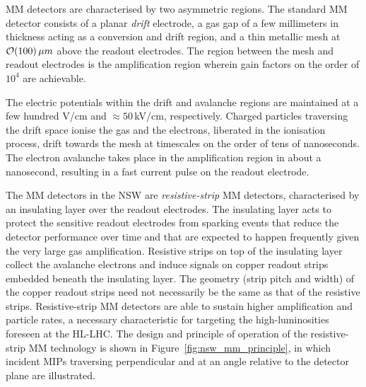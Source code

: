 MM detectors are characterised by two asymmetric regions.
The standard MM detector consists of a planar \textit{drift} electrode, a gas gap of
a few millimeters in thickness acting as a conversion and drift region, and a thin
metallic mesh at $\mathcal{O}(100)\,\mu m$ above the readout electrodes.
The region between the mesh and readout electrodes is the amplification region wherein
gain factors on the order of $10^4$ are achievable.

The electric potentials within the drift and avalanche regions are maintained
at a few hundred V/cm and $\approx50$\,kV/cm, respectively.
Charged particles traversing the drift space ionise the gas and the electrons, liberated
in the ionisation process, drift towards the mesh at timescales on the order of tens of nanoseconds.
The electron avalanche takes place in the amplification region in about a nanosecond,
resulting in a fast current pulse on the readout electrode.

The MM detectors in the NSW are \textit{resistive-strip} MM detectors, characterised by an insulating
layer over the readout electrodes.
The insulating layer acts to protect the sensitive readout electrodes from sparking events that
reduce the detector performance over time and that are expected to happen frequently given
the very large gas amplification.
Resistive strips on top of the insulating layer collect the avalanche electrons and induce
signals on copper readout strips embedded beneath the insulating layer.
The geometry (strip pitch and width) of the copper readout strips need not necessarily be the
same as that of the resistive strips.
Resistive-strip MM detectors are able to sustain higher amplification and particle rates, a necessary
characteristic for targeting the high-luminosities foreseen at the HL-LHC.
The design and principle of operation of the resistive-strip MM technology is shown in Figure~\ref{fig:nsw_mm_principle},
in which incident MIPs traversing perpendicular and at an angle relative to the detector plane
are illustrated.

